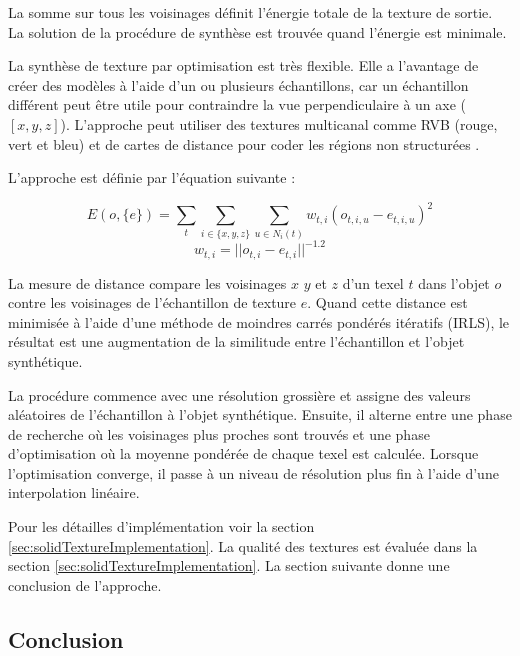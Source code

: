 La somme sur tous les voisinages définit l'énergie totale de la texture de sortie.
La solution de la procédure de synthèse est trouvée quand l'énergie est minimale.

La synthèse de texture par optimisation est très flexible.
Elle a l'avantage de créer des modèles à l'aide d'un ou plusieurs échantillons, 
car un échantillon différent peut être utile pour contraindre la vue perpendiculaire à un axe ($[x, y, z]$).
L'approche peut utiliser des textures multicanal comme RVB (rouge, vert et bleu) et de cartes 
de distance pour coder les régions non structurées \cite{Lefebvre:2006:ATS:1141911.1141921}.

L'approche est définie par l'équation suivante :

\begin{equation}
 E(o, \{e\} ) = \sum_{t} \sum_{i \in \{x, y, z\}} \sum_{u \in N_i(t)} w_{t, i} ( o_{t, i, u} - e_{t, i, u} )^2
 \label{equ:imagenergyfr} 
\end{equation}
\begin{equation}
 w_{t,i} = || o_{t, i} - e_{t, i} ||^{-1.2}
 \label{equ:neighweightfr}
\end{equation}

La mesure de distance compare les voisinages $x$ $y$ et $z$ d'un texel $t$ dans l'objet $o$ contre les voisinages de l'échantillon
de texture $e$.
Quand cette distance est minimisée à l'aide d'une méthode de moindres carrés pondérés itératifs (IRLS),
le résultat est une augmentation de la similitude entre l'échantillon et l'objet synthétique.

La procédure commence avec une résolution grossière et assigne des valeurs aléatoires de l'échantillon à l'objet synthétique.
Ensuite, il alterne entre une phase de recherche où les voisinages plus proches sont trouvés  et une phase d'optimisation 
où la moyenne pondérée de chaque texel est calculée.
Lorsque l'optimisation converge, il passe à un niveau de résolution plus fin à l'aide d'une interpolation linéaire.

Pour les détailles d'implémentation voir la section \ref{sec:solidTextureImplementation}. 
La qualité des textures est évaluée dans la section \ref{sec:solidTextureImplementation}.
La section suivante donne une conclusion de l'approche.


\subsection{Conclusion}
\label{sec:conclusions}

